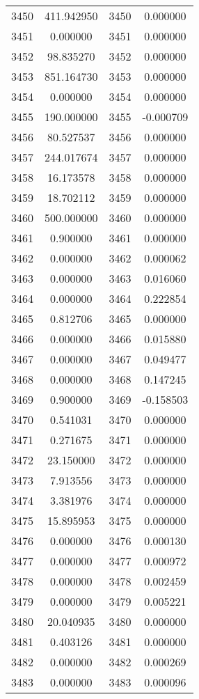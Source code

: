 \documentclass[12pt]{article}
\begin{document}
\begin{longtable}{@{}cccc@{}}
3450 & 411.942950 & 3450 & 0.000000 \\
3451 & 0.000000 & 3451 & 0.000000 \\
3452 & 98.835270 & 3452 & 0.000000 \\
3453 & 851.164730 & 3453 & 0.000000 \\
3454 & 0.000000 & 3454 & 0.000000 \\
3455 & 190.000000 & 3455 & -0.000709 \\
3456 & 80.527537 & 3456 & 0.000000 \\
3457 & 244.017674 & 3457 & 0.000000 \\
3458 & 16.173578 & 3458 & 0.000000 \\
3459 & 18.702112 & 3459 & 0.000000 \\
3460 & 500.000000 & 3460 & 0.000000 \\
3461 & 0.900000 & 3461 & 0.000000 \\
3462 & 0.000000 & 3462 & 0.000062 \\
3463 & 0.000000 & 3463 & 0.016060 \\
3464 & 0.000000 & 3464 & 0.222854 \\
3465 & 0.812706 & 3465 & 0.000000 \\
3466 & 0.000000 & 3466 & 0.015880 \\
3467 & 0.000000 & 3467 & 0.049477 \\
3468 & 0.000000 & 3468 & 0.147245 \\
3469 & 0.900000 & 3469 & -0.158503 \\
3470 & 0.541031 & 3470 & 0.000000 \\
3471 & 0.271675 & 3471 & 0.000000 \\
3472 & 23.150000 & 3472 & 0.000000 \\
3473 & 7.913556 & 3473 & 0.000000 \\
3474 & 3.381976 & 3474 & 0.000000 \\
3475 & 15.895953 & 3475 & 0.000000 \\
3476 & 0.000000 & 3476 & 0.000130 \\
3477 & 0.000000 & 3477 & 0.000972 \\
3478 & 0.000000 & 3478 & 0.002459 \\
3479 & 0.000000 & 3479 & 0.005221 \\
3480 & 20.040935 & 3480 & 0.000000 \\
3481 & 0.403126 & 3481 & 0.000000 \\
3482 & 0.000000 & 3482 & 0.000269 \\
3483 & 0.000000 & 3483 & 0.000096 \\

\end{longtable}
\end{document}

